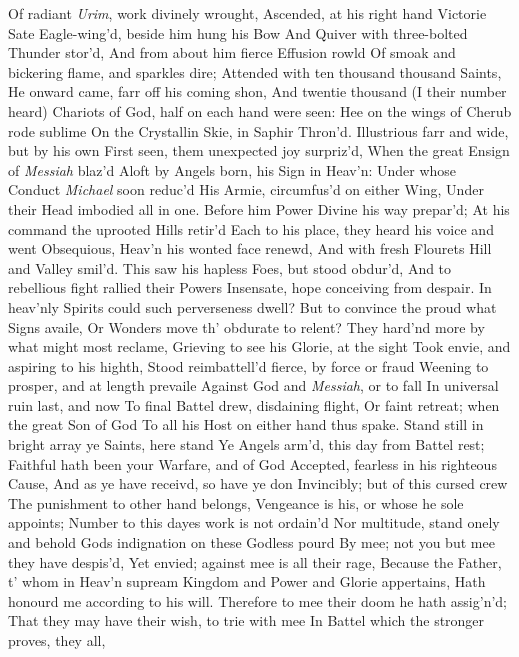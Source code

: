 \documentclass[11pt]{book}
\newcounter {last}
\begin{document}
Of radiant \textit{Urim}, work divinely wrought, 
Ascended, at his right hand Victorie 
Sate Eagle-wing'd, beside him hung his Bow 
And Quiver with three-bolted Thunder stor'd, 
And from about him fierce Effusion rowld 
Of smoak and bickering flame, and sparkles dire; 
Attended with ten thousand thousand Saints, 
He onward came, farr off his coming shon, 
And twentie thousand (I their number heard) 
Chariots of God, half on each hand were seen: 
Hee on the wings of Cherub rode sublime 
On the Crystallin Skie, in Saphir Thron'd. 
Illustrious farr and wide, but by his own 
First seen, them unexpected joy surpriz'd, 
When the great Ensign of \textit{Messiah} blaz'd 
Aloft by Angels born, his Sign in Heav'n: 
Under whose Conduct \textit{Michael} soon reduc'd 
His Armie, circumfus'd on either Wing, 
Under their Head imbodied all in one. 
Before him Power Divine his way prepar'd; 
At his command the uprooted Hills retir'd 
Each to his place, they heard his voice and went 
Obsequious, Heav'n his wonted face renewd, 
And with fresh Flourets Hill and Valley smil'd. 
This saw his hapless Foes, but stood obdur'd, 
And to rebellious fight rallied their Powers 
Insensate, hope conceiving from despair. 
In heav'nly Spirits could such perverseness dwell? 
But to convince the proud what Signs availe, 
Or Wonders move th' obdurate to relent? 
They hard'nd more by what might most reclame, 
Grieving to see his Glorie, at the sight 
Took envie, and aspiring to his highth, 
Stood reimbattell'd fierce, by force or fraud 
Weening to prosper, and at length prevaile 
Against God and \textit{Messiah}, or to fall 
In universal ruin last, and now 
To final Battel drew, disdaining flight, 
Or faint retreat; when the great Son of God 
To all his Host on either hand thus spake. 
\quad Stand still in bright array ye Saints, here stand 
Ye Angels arm'd, this day from Battel rest; 
Faithful hath been your Warfare, and of God 
Accepted, fearless in his righteous Cause, 
And as ye have receivd, so have ye don 
Invincibly; but of this cursed crew 
The punishment to other hand belongs, 
Vengeance is his, or whose he sole appoints; 
Number to this dayes work is not ordain'd 
Nor multitude, stand onely and behold 
Gods indignation on these Godless pourd 
By mee; not you but mee they have despis'd, 
Yet envied; against mee is all their rage, 
Because the Father, t' whom in Heav'n supream 
Kingdom and Power and Glorie appertains, 
Hath honourd me according to his will. 
Therefore to mee their doom he hath assig'n'd; 
That they may have their wish, to trie with mee 
In Battel which the stronger proves, they all, 
\end{document}
